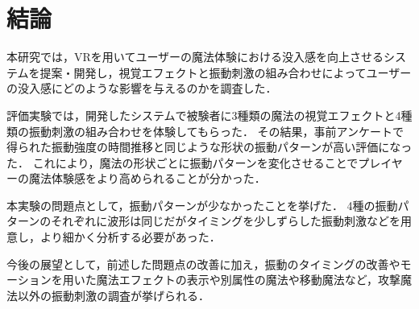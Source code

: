 \chapter{結論}
本研究では，VRを用いてユーザーの魔法体験における没入感を向上させるシステムを提案・開発し，視覚エフェクトと振動刺激の組み合わせによってユーザーの没入感にどのような影響を与えるのかを調査した．

評価実験では，開発したシステムで被験者に3種類の魔法の視覚エフェクトと4種類の振動刺激の組み合わせを体験してもらった．
その結果，事前アンケートで得られた振動強度の時間推移と同じような形状の振動パターンが高い評価になった．
これにより，魔法の形状ごとに振動パターンを変化させることでプレイヤーの魔法体験感をより高められることが分かった．

本実験の問題点として，振動パターンが少なかったことを挙げた．
4種の振動パターンのそれぞれに波形は同じだがタイミングを少しずらした振動刺激などを用意し，より細かく分析する必要があった．

今後の展望として，前述した問題点の改善に加え，振動のタイミングの改善やモーションを用いた魔法エフェクトの表示や別属性の魔法や移動魔法など，攻撃魔法以外の振動刺激の調査が挙げられる．
  